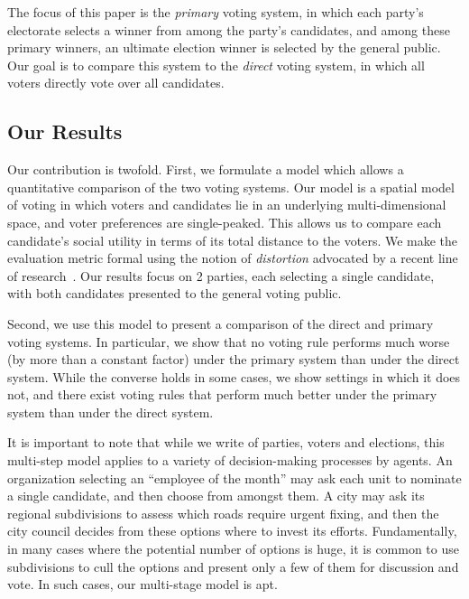 \documentclass[letterpaper]{article} %
\newcommand{\kibitz}[2]{\ifnum\Comments=1{\color{#1}{#2}}\fi}
\newcommand{\ns}[1]{\kibitz{blue}{[Nisarg: #1]}}
\theoremstyle{definition}
\begin{document}

The focus of this paper is the \emph{primary} voting system, in which each party's electorate selects a winner from among the party's candidates, and among these primary winners, an ultimate election winner is selected by the general public. Our goal is to compare this system to the \emph{direct} voting system, in which all voters directly vote over all candidates.

\subsection{Our Results}
Our contribution is twofold. First, we formulate a model which allows a quantitative comparison of the two voting systems. Our model is a spatial model of voting in which voters and candidates lie in an underlying multi-dimensional space, and voter preferences are single-peaked. This allows us to compare each candidate's social utility in terms of its total distance to the voters. We make the evaluation metric formal using the notion of \emph{distortion} advocated by a recent line of research~\cite{PR06,BCHL+15}. Our results focus on 2 parties, each selecting a single candidate, with both candidates presented to the general voting public.

Second, we use this model to present a comparison of the direct and primary voting systems. In particular, we show that no voting rule performs much worse (by more than a constant factor) under the primary system than under the direct system. While the converse holds in some cases, we show settings in which it does not, and there exist voting rules that perform much better under the primary system than under the direct system.%

It is important to note that while we write of parties, voters and elections, this multi-step model applies to a variety of decision-making processes by agents. An organization selecting an ``employee of the month'' may ask each unit to nominate a single candidate, and then choose from amongst them. A city may ask its regional subdivisions to assess which roads require urgent fixing, and then the city council decides from these options where to invest its efforts. Fundamentally, in many cases where the potential number of options is huge, it is common to use subdivisions to cull the options and present only a few of them for discussion and vote. In such cases, our multi-stage model is apt. %
\end{document}
